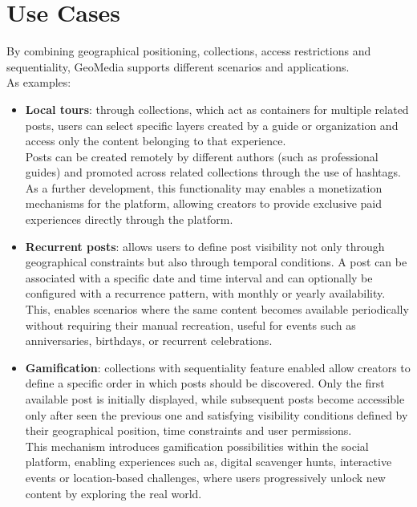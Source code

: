 \section{Use Cases}
\label{sub:use_case}
By combining geographical positioning, collections, access restrictions and sequentiality, GeoMedia supports different scenarios and applications. \\
As examples:

\begin{itemize}
    \item \textbf{Local tours}: through collections, which act as containers for multiple related posts, users can select specific layers created by a guide or organization and access only the content belonging to that experience. \\
    Posts can be created remotely by different authors (such as professional guides) and promoted across related collections through the use of hashtags. As a further development, this functionality may enables a monetization mechanisms for the platform, allowing creators to provide exclusive paid experiences directly through the platform.

    \item \textbf{Recurrent posts}: allows users to define post visibility not only through geographical constraints but also through temporal conditions. A post can be associated with a specific date and time interval and can optionally be configured with a recurrence pattern, with monthly or yearly availability. This, enables scenarios where the same content becomes available periodically without requiring their manual recreation, useful for events such as anniversaries, birthdays, or recurrent celebrations.

    \item \textbf{Gamification}: collections with sequentiality feature enabled allow creators to define a specific order in which posts should be discovered. Only the first available post is initially displayed, while subsequent posts become accessible only after seen the previous one and satisfying visibility conditions defined by their geographical position, time constraints and user permissions.\\
    This mechanism introduces gamification possibilities within the social platform, enabling experiences such as, digital scavenger hunts, interactive events or location-based challenges, where users progressively unlock new content by exploring the real world.

\end{itemize}


